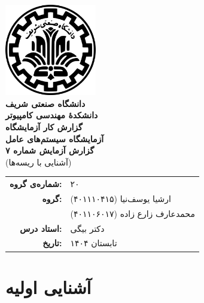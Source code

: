 \documentclass[12pt]{article}
\newcommand{\persianordinal}[1]{%
	\ifcase#1
	\or اول%
	\or دوم%
	\or سوم%
	\or چهارم%
	\or پنجم%
	\or ششم%
	\or هفتم%
	\or هشتم%
	\or نهم%
	\or دهم%
	\or یازدهم%
	\or دوازدهم%
	\or سیزدهم%
	\or چهاردهم%
	\or پانزدهم%
	\or شانزدهم%
	\or هفدهم%
	\or هجدهم%
	\or نوزدهم%
	\or بیستم%
	\else #1\fi
}
\newcommand{\persianordinalpage}{\persianfont\persianordinal{\value{page}}}
\begin{document}
	
	\begin{titlepage}
		\centering
		\vspace*{1cm}
		\includegraphics[width=4cm]{sharif.png}\\[1.5cm]
		{\Large\textbf{دانشگاه صنعتی شریف}}\\[0.5cm]
		{\large\textbf{دانشکده‌ٔ مهندسی کامپیوتر}}\\[1.5cm]
		{\Huge\textbf{گزارش کار آزمایشگاه}}\\[0.5cm]
		{\LARGE\textbf{آزمایشگاه سیستم‌های عامل}}\\[2cm]
		
		\textbf{گزارش آزمایش شماره ۷}\\
		(آشنایی با ریسه‌ها)
		
		\vfill
		\begin{tabular}{rl}
			\textbf{شماره‌ی گروه:} & ۲۰ \\
			\textbf{گروه:} &
			ارشیا یوسف‌نیا (۴۰۱۱۱۰۴۱۵) \\
			& محمدعارف زارع زاده (۴۰۱۱۰۶۰۱۷) \\
			\textbf{استاد درس:} & دکتر بیگی \\
			\textbf{تاریخ:} & تابستان ۱۴۰۴ \\
		\end{tabular}
	\end{titlepage}
	
	\clearpage
	\setcounter{page}{1}
	\renewcommand{\thepage}{\persianordinalpage}
	
	\tableofcontents
	\clearpage
	\listoffigures
	
	\clearpage
	\setcounter{page}{1}
	\renewcommand{\thepage}{\persianfont\arabic{page}}
	
	
	\section{آشنایی اولیه}
\end{document}
